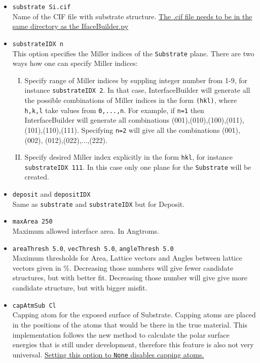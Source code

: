 \documentclass[a4paper,12pt,oneside]{article}
\begin{document}
\begin{itemize}
\item{\texttt{substrate   Si.cif}}\\
Name of the CIF file with substrate structure. \uline{The .cif file needs to be in the same directory as the IfaceBuilder.py}

\item{\texttt{substrateIDX  n}}\\
This option specifies the Miller indices of the \texttt{Substrate} plane. There
are two ways how one can specify Miller indices:
\begin{enumerate}[I.]
\item Specify range of Miller indices by suppling integer number from 1-9,
for instance \texttt{substrateIDX  2}. In that case, InterfaceBuilder will
generate all the possible combinations of Miller indices in the form
\texttt{(hkl)}, where \texttt{h,k,l} take values from \texttt{0,...,n}. For
example, if
\texttt{n=1} then InterfaceBuilder will generate all combinations
(001),(010),(100),(011),(101),(110),(111). Specifying \texttt{n=2} will give all
the combinations (001),(002), (012),(022),...,(222).
\item Specify desired Miller index explicitly in the form \texttt{hkl}, for
instance \texttt{substrateIDX  111}. In this case only one plane for the
\texttt{Substrate} will be created.
\end{enumerate}

\item{\texttt{deposit} and \texttt{depositIDX}}\\
Same as \texttt{substrate} and \texttt{substrateIDX} but for Deposit.

\item{\texttt{maxArea       250}}\\
Maximum allowed interface area. In Angtroms. 

\item{\texttt{areaThresh    5.0}, \texttt{vecThresh     5.0},
\texttt{angleThresh   5.0}} \\
Maximum thresholds for Area, Lattice vectors and Angles between lattice vectors
given in \%. Decreasing those numbers will give fewer candidate structures, but with
better fit. Decreasing those number will give give more candidate structure, but
with bigger misfit. 

\item{\texttt{capAtmSub     Cl}}\\
Capping atom for the exposed surface of Substrate. Capping atoms are placed in
the positions of the atoms that would be there in the true material. This
implementation follows the new method to calculate the polar surface energies
that is still under development, therefore this feature is also not very
universal. \uline{Setting this option to \texttt{None} disables capping atoms.}


\end{itemize}
\end{document}
